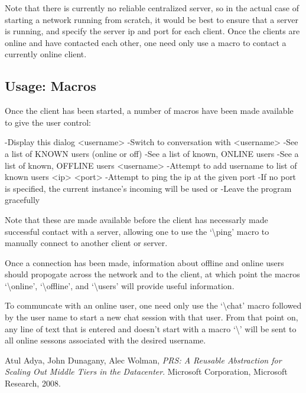 \documentclass[11pt]{article}
\begin{document}
Note that there is currently no reliable centralized server, so in the actual case of starting a network running from scratch, it would be best to ensure that a server is running, and specify the server ip and port for each client. Once the clients are online and have contacted each other, one need only use a macro to contact a currently online client.

\subsection{Usage: Macros}
Once the client has been started, a number of macros have been made available to give the user control:
\begin{code}
  \help
   -Display this dialog
  \chat <username>
   -Switch to conversation with <username>
  \users
   -See a list of KNOWN users (online or off)
  \online
   -See a list of known, ONLINE users
  \offline
   -See a list of known, OFFLINE users
  \add <username>
   -Attempt to add username to list of known users
  \ping <ip> <port>
  -Attempt to ping the ip at the given port
  -If no port is specified, the current instance's incoming will be used
  \quit or \exit
   -Leave the program gracefully
\end{code}

Note that these are made available before the client has necessarly made successful contact with a server, allowing one to use the `\textbackslash ping' macro to manually connect to another client or server.

Once a connection has been made, information about offline and online users should propogate across the network and to the client, at which point the macros `\textbackslash online', `\textbackslash offline', and `\textbackslash users' will provide useful information. 

To communcate with an online user, one need only use the `\textbackslash chat' macro followed by the user name to start a new chat session with that user. From that point on, any line of text that is entered and doesn't start with a macro `\textbackslash' will be sent to all online sessons associated with the desired username.

\begin{thebibliography}{1}

	  Atul Adya, John Dunagany, Alec Wolman,
	  \emph{PRS: A Reusable Abstraction for Scaling Out Middle Tiers in the Datacenter}.
	  Microsoft Corporation, Microsoft Research,
	  2008.
\end{thebibliography}
\end{document}
